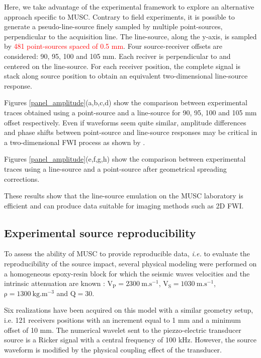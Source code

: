 \documentclass[manuscript,revised]{geophysics}
\begin{document}
\noindent Here, we take advantage of the experimental framework to explore an alternative approach specific to MUSC. Contrary to field experiments, it is possible to generate a pseudo-line-source finely sampled by multiple point-sources, perpendicular to the acquisition line. The line-source, along the y-axis, is sampled by \textcolor{red}{481 point-sources spaced of 0.5 mm}. Four source-receiver offsets are considered: 90, 95, 100 and 105 mm. Each reciver is perpendicular to and centered on the line-source. For each receiver position, the complete signal is stack along source position to obtain an equivalent two-dimensional line-source response.
 
\noindent Figures \ref{panel_amplitude}(a,b,c,d) show the comparison between experimental traces obtained using a point-source and a line-source for 90, 95, 100 and 105 mm offset respectively. Even if waveforms seem quite similar, amplitude differences and phase shifts between point-source and line-source responses may be critical in a two-dimensional FWI process as shown by \citet{Schafer_LSS_2014}.

\noindent Figures \ref{panel_amplitude}(e,f,g,h) show the comparison between experimental traces using a line-source and a point-source after geometrical spreading corrections.  

\noindent These results show that the line-source emulation on the MUSC laboratory is efficient and can produce data suitable for imaging methods such as 2D FWI.


\subsection{Experimental source reproducibility}

\noindent To assess the ability of MUSC to provide reproducible data, \textit{i.e.} to evaluate the reproducibility of the source impact, several physical modeling were performed on a homogeneous epoxy-resin block for which the seismic waves velocities and the intrinsic attenuation are known : $\mathrm{V_{P}=2300\ m.s^{-1}}$, $\mathrm{V_{S}=1030\ m.s^{-1}}$, $\mathrm{\rho=1300\ kg.m^{-3}}$ and $\mathrm{Q=30}$. 

\noindent Six realizations have been acquired on this model with a similar geometry setup, i.e. 121 receivers positions with an increment equal to 1 mm and a minimum offset of 10 mm. The numerical wavelet sent to the piezzo-electric transducer source is a Ricker signal with a central frequency of 100 kHz. However, the source waveform is modified by the physical coupling effect of the transducer. 
\end{document}
